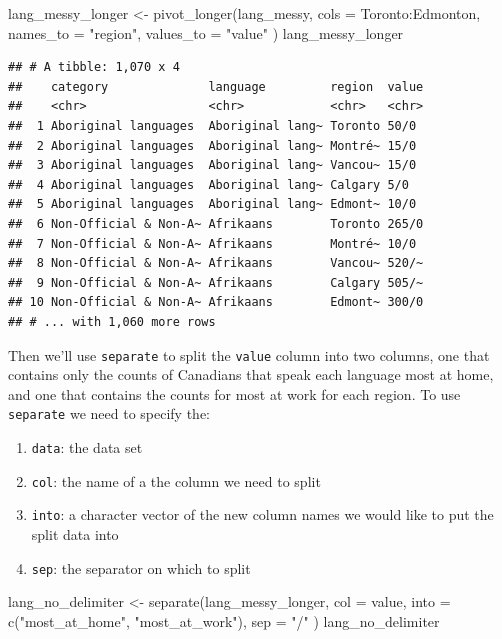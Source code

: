 \documentclass[
]{krantz}
\makeatletter
\newenvironment{Shaded}{\begin{snugshade}}{\end{snugshade}}
\newcommand{\AttributeTok}[1]{\textcolor[rgb]{0.61,0.61,0.61}{#1}}
\newcommand{\FunctionTok}[1]{\textcolor[rgb]{0,0,0}{#1}}
\newcommand{\NormalTok}[1]{#1}
\newcommand{\OtherTok}[1]{\textcolor[rgb]{0.37,0.37,0.37}{#1}}
\newcommand{\SpecialCharTok}[1]{\textcolor[rgb]{0,0,0}{#1}}
\newcommand{\StringTok}[1]{\textcolor[rgb]{0.5,0.5,0.5}{#1}}
\newenvironment{kframe}{%
\medskip{}
\setlength{\fboxsep}{.8em}
 \def\at@end@of@kframe{}%
 \ifinner\ifhmode%
  \def\at@end@of@kframe{\end{minipage}}%
  \begin{minipage}{\columnwidth}%
 \fi\fi%
 \def\FrameCommand##1{\hskip\@totalleftmargin \hskip-\fboxsep
 \colorbox{shadecolor}{##1}\hskip-\fboxsep
     \hskip-\linewidth \hskip-\@totalleftmargin \hskip\columnwidth}%
 \MakeFramed {\advance\hsize-\width
   \@totalleftmargin\z@ \linewidth\hsize
   \@setminipage}}%
 {\par\unskip\endMakeFramed%
 \at@end@of@kframe}
\renewenvironment{Shaded}{\begin{kframe}}{\end{kframe}}
\makeatother
\begin{document}
\begin{Shaded}
\begin{Highlighting}[]
\NormalTok{lang\_messy\_longer }\OtherTok{\textless{}{-}} \FunctionTok{pivot\_longer}\NormalTok{(lang\_messy,}
  \AttributeTok{cols =}\NormalTok{ Toronto}\SpecialCharTok{:}\NormalTok{Edmonton,}
  \AttributeTok{names\_to =} \StringTok{"region"}\NormalTok{,}
  \AttributeTok{values\_to =} \StringTok{"value"}
\NormalTok{)}
\NormalTok{lang\_messy\_longer}
\end{Highlighting}
\end{Shaded}

\begin{verbatim}
## # A tibble: 1,070 x 4
##    category              language         region  value
##    <chr>                 <chr>            <chr>   <chr>
##  1 Aboriginal languages  Aboriginal lang~ Toronto 50/0 
##  2 Aboriginal languages  Aboriginal lang~ Montré~ 15/0 
##  3 Aboriginal languages  Aboriginal lang~ Vancou~ 15/0 
##  4 Aboriginal languages  Aboriginal lang~ Calgary 5/0  
##  5 Aboriginal languages  Aboriginal lang~ Edmont~ 10/0 
##  6 Non-Official & Non-A~ Afrikaans        Toronto 265/0
##  7 Non-Official & Non-A~ Afrikaans        Montré~ 10/0 
##  8 Non-Official & Non-A~ Afrikaans        Vancou~ 520/~
##  9 Non-Official & Non-A~ Afrikaans        Calgary 505/~
## 10 Non-Official & Non-A~ Afrikaans        Edmont~ 300/0
## # ... with 1,060 more rows
\end{verbatim}

Then we'll use \texttt{separate} to split the \texttt{value} column into two columns, one that contains only the counts of Canadians that speak each language most at home, and one that contains the counts for most at work for each region. To use \texttt{separate} we need to specify the:

\begin{enumerate}
\def\labelenumi{\arabic{enumi}.}
\item
  \texttt{data}: the data set
\item
  \texttt{col}: the name of a the column we need to split
\item
  \texttt{into}: a character vector of the new column names we would like to put the split data into
\item
  \texttt{sep}: the separator on which to split
\end{enumerate}

\begin{Shaded}
\begin{Highlighting}[]
\NormalTok{lang\_no\_delimiter }\OtherTok{\textless{}{-}} \FunctionTok{separate}\NormalTok{(lang\_messy\_longer,}
  \AttributeTok{col =}\NormalTok{ value,}
  \AttributeTok{into =} \FunctionTok{c}\NormalTok{(}\StringTok{"most\_at\_home"}\NormalTok{, }\StringTok{"most\_at\_work"}\NormalTok{),}
  \AttributeTok{sep =} \StringTok{"/"}
\NormalTok{)}
\NormalTok{lang\_no\_delimiter}
\end{Highlighting}
\end{Shaded}
\end{document}
